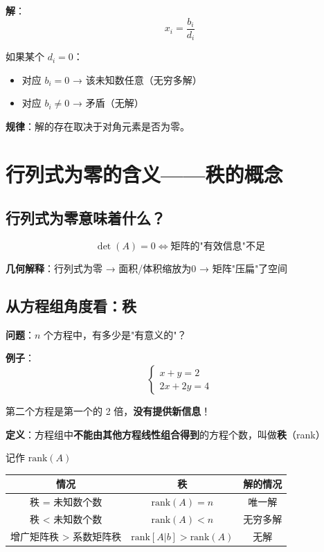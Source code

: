 \documentclass[12pt,a4paper]{article}
\begin{document}
\textbf{解}：
\[
x_i = \frac{b_i}{d_i}
\]

如果某个 $d_i = 0$：
\begin{itemize}
    \item 对应 $b_i = 0$ → 该未知数任意（无穷多解）
    \item 对应 $b_i \neq 0$ → 矛盾（无解）
\end{itemize}

\textbf{规律}：解的存在取决于对角元素是否为零。

\section{行列式为零的含义——秩的概念}

\subsection{行列式为零意味着什么？}

\[
\det(A) = 0 \iff \text{矩阵的"有效信息"不足}
\]

\textbf{几何解释}：行列式为零 → 面积/体积缩放为0 → 矩阵"压扁"了空间

\subsection{从方程组角度看：秩}

\textbf{问题}：$n$ 个方程中，有多少是"有意义的"？

\textbf{例子}：
\[
\begin{cases}
x + y = 2 \\
2x + 2y = 4
\end{cases}
\]

第二个方程是第一个的 2 倍，\textbf{没有提供新信息}！

\textbf{定义}：方程组中\textbf{不能由其他方程线性组合得到}的方程个数，叫做\textbf{秩}（rank）

记作 $\text{rank}(A)$

\begin{center}
\begin{tabular}{|c|c|c|}
\hline
情况 & 秩 & 解的情况 \\
\hline
秩 = 未知数个数 & $\text{rank}(A) = n$ & 唯一解 \\
\hline
秩 < 未知数个数 & $\text{rank}(A) < n$ & 无穷多解 \\
\hline
增广矩阵秩 > 系数矩阵秩 & $\text{rank}[A|b] > \text{rank}(A)$ & 无解 \\
\hline
\end{tabular}
\end{center}
\end{document}

